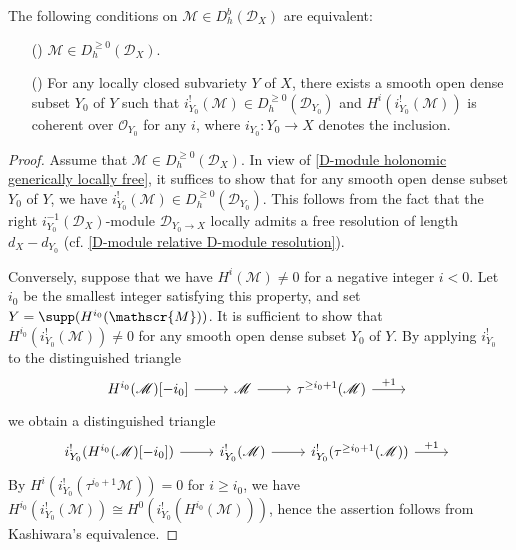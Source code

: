 \begin{lemma}\label{D-module holonomic regular derived D^geq 0 iff smooth subvariety}
The following conditions on $\mathscr{M}\in D^b_h(\mathscr{D}_X)$ are equivalent:
\begin{enumerate}
    \item[(\rmnum{1})] $\mathscr{M}\in D^{\geq 0}_h(\mathscr{D}_X)$.
    \item[(\Rmnum{2})] For any locally closed subvariety $Y$ of $X$, there exists a smooth open dense subset $Y_0$ of $Y$ such that $i_{Y_0}^!(\mathscr{M})\in D^{\geq 0}_h(\mathscr{D}_{Y_0})$ and $H^i(i_{Y_0}^!(\mathscr{M}))$ is coherent over $\mathscr{O}_{Y_0}$ for any $i$, where $i_{Y_0}:Y_0\to X$ denotes the inclusion.
\end{enumerate}
\end{lemma}
\begin{proof}
Assume that $\mathscr{M}\in D^{\geq 0}_h(\mathscr{D}_X)$. In view of \cref{D-module holonomic generically locally free}, it suffices to show that for any smooth open dense subset $Y_0$ of $Y$, we have $i_{Y_0}^!(\mathscr{M})\in D_h^{\geq 0}(\mathscr{D}_{Y_0})$. This follows from the fact that the right $i_{Y_0}^{-1}(\mathscr{D}_X)$-module $\mathscr{D}_{Y_0\rightarrow X}$ locally admits a free resolution of length $d_X-d_{Y_0}$ (cf. \cref{D-module relative D-module resolution}).\par
Conversely, suppose that we have $H^i(\mathscr{M})\neq 0$ for a negative integer $i<0$. Let $i_0$ be the smallest integer satisfying this property, and set $Y=\supp(H^{i_0}(\mathscr{M}))$. It is sufficient to show that $H^{i_0}(i_{Y_0}^!(\mathscr{M}))\neq 0$ for any smooth open dense subset $Y_0$ of $Y$. By applying $i_{Y_0}^!$ to the distinguished triangle
\[\begin{tikzcd}
H^{i_0}(\mathscr{M})[-i_0]\ar[r]&\mathscr{M}\ar[r]&\tau^{\geq i_0+1}(\mathscr{M})\ar[r,"+1"]&{}
\end{tikzcd}\]
we obtain a distinguished triangle
\[\begin{tikzcd}
i_{Y_0}^!(H^{i_0}(\mathscr{M})[-i_0])\ar[r]&i_{Y_0}^!(\mathscr{M})\ar[r]&i_{Y_0}^!(\tau^{\geq i_0+1}(\mathscr{M}))\ar[r,"+1"]&{}
\end{tikzcd}\]
By $H^i(i_{Y_0}^!(\tau^{i_0+1}\mathscr{M}))=0$ for $i\geq i_0$, we have $H^{i_0}(i_{Y_0}^!(\mathscr{M}))\cong H^0(i_{Y_0}^!(H^{i_0}(\mathscr{M})))$, hence the assertion follows from Kashiwara's equivalence.
\end{proof}

